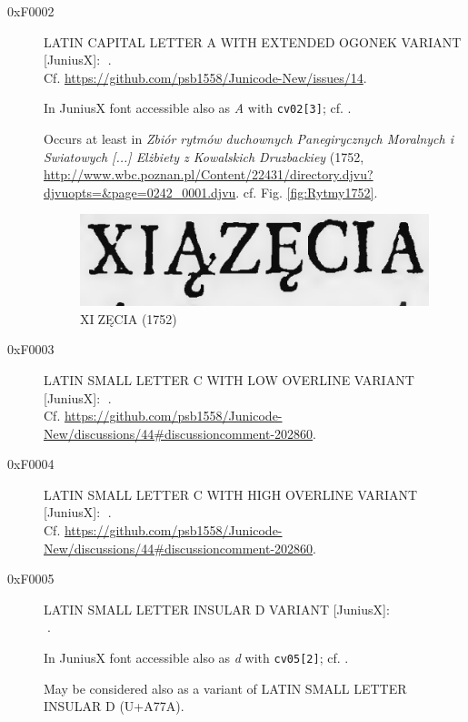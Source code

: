 \documentclass{article}
\newcommand{\Jglyph}[1]{{\relsize{2}\J#1}}
\begin{document}
\begin{description}
\item [0xF0002] LATIN CAPITAL LETTER A WITH EXTENDED OGONEK VARIANT [JuniusX]: 
  \Jglyph{󰀂}.\\ Cf. \url{https://github.com/psb1558/Junicode-New/issues/14}.

  In JuniusX font accessible also as \textit{A} with \texttt{cv02[3]};
  cf. \autocite[p. 7]{baker20:_opent_featur_junius_junius}.


  Occurs at least in \textit{Zbiór rytmów duchownych Panegirycznych
    Moralnych i Swiatowych [...] Elżbiety z Kowalskich Druzbackiey}
  (1752,
  \url{http://www.wbc.poznan.pl/Content/22431/directory.djvu?djvuopts=&page=0242_0001.djvu}.
  cf. Fig. \vref{fig:Rytmy1752}.

  \begin{figure}[h]
    \includegraphics{img/00487576ksiazecia}
    \caption{{\J XI󰀂ZĘCIA} (1752)}
    \label{fig:Rytmy1752}
  \end{figure}
  
\item [0xF0003] LATIN SMALL LETTER C WITH LOW OVERLINE VARIANT [JuniusX]: 
  \Jglyph{󰀃}.\\ Cf. \url{https://github.com/psb1558/Junicode-New/discussions/44#discussioncomment-202860}.
\item [0xF0004] LATIN SMALL LETTER C WITH HIGH OVERLINE VARIANT [JuniusX]: 
  \Jglyph{󰀄}.\\ Cf. \url{https://github.com/psb1558/Junicode-New/discussions/44#discussioncomment-202860}.
\item [0xF0005] LATIN SMALL LETTER INSULAR D VARIANT [JuniusX]:\\
  \Jglyph{󰀅}.%

  In JuniusX font accessible also as \textit{d} with \texttt{cv05[2]};
  cf. \autocite[p. 7]{baker20:_opent_featur_junius_junius}.

  May be considered also as a variant of LATIN SMALL LETTER INSULAR D (U+A77A).



\end{description}
\end{document}
